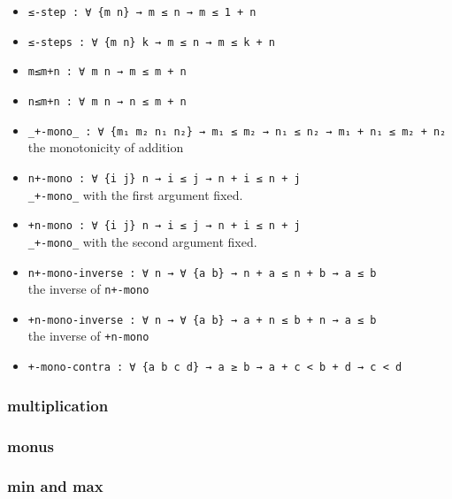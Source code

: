 \documentclass[../thesis.tex]{subfiles}
\begin{document}
\begin{itemize}
    \item {\lstinline|≤-step : ∀ {m n} → m ≤ n → m ≤ 1 + n|}
    \item {\lstinline|≤-steps : ∀ {m n} k → m ≤ n → m ≤ k + n|}
    \item {\lstinline|m≤m+n : ∀ m n → m ≤ m + n|}
    \item {\lstinline|n≤m+n : ∀ m n → n ≤ m + n|}
    \item {\lstinline|_+-mono_ : ∀ {m₁ m₂ n₁ n₂} → m₁ ≤ m₂ → n₁ ≤ n₂ → m₁ + n₁ ≤ m₂ + n₂|}
        \\ the monotonicity of addition
    \item {\lstinline|n+-mono : ∀ {i j} n → i ≤ j → n + i ≤ n + j|}
        \\ {\lstinline|_+-mono_|} with the first argument fixed.
    \item {\lstinline|+n-mono : ∀ {i j} n → i ≤ j → n + i ≤ n + j|}
        \\ {\lstinline|_+-mono_|} with the second argument fixed.
    \item {\lstinline|n+-mono-inverse : ∀ n → ∀ {a b} → n + a ≤ n + b → a ≤ b|}
        \\ the inverse of {\lstinline|n+-mono|}
    \item {\lstinline|+n-mono-inverse : ∀ n → ∀ {a b} → a + n ≤ b + n → a ≤ b|}
        \\ the inverse of {\lstinline|+n-mono|}
    \item {\lstinline|+-mono-contra : ∀ {a b c d} → a ≥ b → a + c < b + d → c < d|}
\end{itemize}
\subsubsection{multiplication}
\subsubsection{monus}
\subsubsection{min and max}
\end{document}

